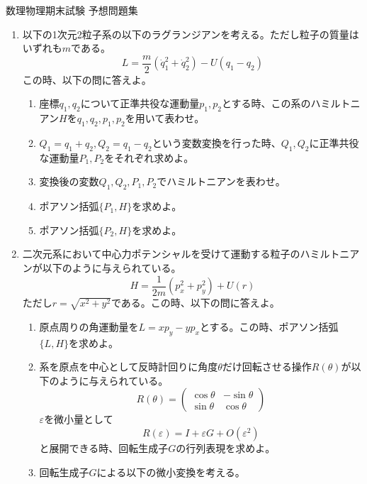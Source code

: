 \documentclass{jsarticle}
\begin{document}
\begin{center}
  {\huge 数理物理期末試験 予想問題集}\\
\end{center}

\begin{enumerate}
  \item 以下の1次元2粒子系の以下のラグランジアンを考える。ただし粒子の質量はいずれも$m$である。
        $$
          L = \frac{m}{2}(\dot{q}_1^2+\dot{q}_2^2) - U(q_1-q_2)
        $$
        この時、以下の問に答えよ。
        \begin{enumerate}
          \item 座標$q_1, q_2$について正準共役な運動量$p_1, p_2$とする時、この系のハミルトニアン$H$を$q_1, q_2, p_1, p_2$を用いて表わせ。
          \item $Q_1 = q_1 + q_2, Q_2 = q_1 - q_2$という変数変換を行った時、$Q_1, Q_2$に正準共役な運動量$P_1, P_2$をそれぞれ求めよ。
          \item 変換後の変数$Q_1, Q_2, P_1, P_2$でハミルトニアンを表わせ。
          \item ポアソン括弧$\{P_1, H\}$を求めよ。
          \item ポアソン括弧$\{P_2, H\}$を求めよ。
        \end{enumerate}
  \item 二次元系において中心力ポテンシャルを受けて運動する粒子のハミルトニアンが以下のように与えられている。
        $$
          H=\frac{1}{2m}(p_x^2 + p_y^2) + U(r)
        $$
        ただし$r = \sqrt{x^2+y^2}$である。この時、以下の問に答えよ。
        \begin{enumerate}
          \item 原点周りの角運動量を$L = x p_y - y p_x$とする。この時、ポアソン括弧$\{L, H\}$を求めよ。
          \item 系を原点を中心として反時計回りに角度$\theta$だけ回転させる操作$R(\theta)$が以下のように与えられている。
                $$
                  R(\theta) = \begin{pmatrix}
                    \cos \theta & -\sin \theta \\
                    \sin \theta & \cos \theta
                  \end{pmatrix}
                $$
                $\varepsilon$を微小量として
                $$
                  R(\varepsilon) = I + \varepsilon G + O(\varepsilon^2)
                $$
                と展開できる時、回転生成子$G$の行列表現を求めよ。
          \item 回転生成子$G$による以下の微小変換を考える。

\end{enumerate}
\end{enumerate}
\end{document}

